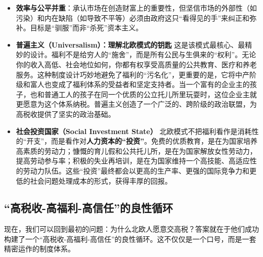 \begin{itemize}
\item \textbf{效率与公平并重}：承认市场在创造财富上的重要性，但坚信市场的外部性（如污染）和内在缺陷（如导致不平等）必须由政府这只“看得见的手”来纠正和弥补。目标是“驯服”而非“杀死”资本主义。
\item \textbf{普遍主义（Universalism）：理解北欧模式的钥匙}
这是该模式最核心、最精妙的设计。福利不是给穷人的“施舍”，而是所有公民与生俱来的“权利”。无论你的收入高低、社会地位如何，你都有权享受高质量的公共教育、医疗和养老服务。这种制度设计巧妙地避免了福利的“污名化”，更重要的是，它将中产阶级和富人也变成了福利体系的受益者和坚定支持者。当一个富有的企业主的孩子，也和普通工人的孩子在同一个优质的公立托儿所里玩耍时，这位企业主就更愿意为这个体系纳税。普遍主义创造了一个广泛的、跨阶级的政治联盟，为高税收提供了坚实的政治基础。
\item \textbf{社会投资国家（Social Investment State）}
北欧模式不把福利看作是消耗性的“开支”，而是看作对\textbf{人力资本的“投资”}。免费的优质教育，是在为国家培养高素质的劳动力；慷慨的育儿假和公共托儿所，是在为国家解放女性劳动力，提高劳动参与率；积极的失业再培训，是在为国家维持一个高技能、高适应性的劳动力队伍。这些“投资”最终都会以更高的生产率、更强的国际竞争力和更低的社会问题处理成本的形式，获得丰厚的回报。
\end{itemize}

\subsection{“高税收-高福利-高信任”的良性循环}

现在，我们可以回到最初的问题：为什么北欧人愿意交高税？答案就在于他们成功构建了一个“高税收-高福利-高信任”的良性循环。这不仅仅是一个口号，而是一套精密运作的制度体系。


